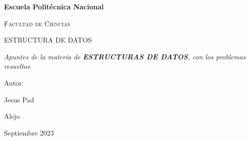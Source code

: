 \documentclass[12pt]{article}
\begin{document}
\begin{titlepage}
\centering
{\bfseries\LARGE Escuela Politécnica Nacional \par}
\vspace{1cm}
{\scshape\Large Facultad de Ciencias \par}
\vspace{3cm}
{\scshape\Huge ESTRUCTURA DE DATOS \par}
\vspace{3cm}
{\itshape\Large Apuntes de la materia de \textbf{ESTRUCTURAS DE DATOS}, con los problemas resueltos \par}
\vfill
{\Large Autor: \par}
{\Large Jesus Pad \par}
{\Large Alejo \par}
\vfill
{\Large Septiembre 2023 \par}

\end{titlepage}
\tableofcontents
\newpage
\vspace{\baselineskip} %
\end{document}
